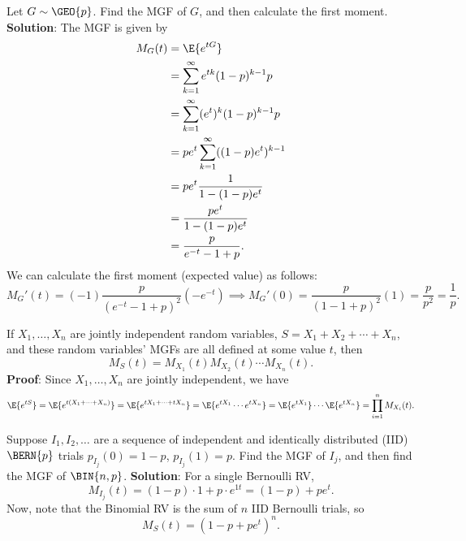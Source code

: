 \begin{Example}{}{}
    Let $ G\sim \GEO{p} $. Find the MGF
    of $ G $, and then calculate the first moment.
    \tcblower{}
    \textbf{Solution}: The MGF is given by
    \begin{align*}
        M_G(t)
         & =\E{e^{tG}}                                \\
         & =\sum_{k=1}^{\infty}e^{tk}(1-p)^{k-1}p     \\
         & =\sum_{k=1}^{\infty}(e^{t})^k(1-p)^{k-1}p  \\
         & =p e^t \sum_{k=1}^{\infty}((1-p)e^t)^{k-1} \\
         & =p e^t \frac{1}{1-(1-p)e^t}                \\
         & =\frac{pe^t}{1-(1-p)e^t}                   \\
         & =\frac{p}{e^{-t}-1+p}.
    \end{align*}
    We can calculate the first moment (expected value) as follows:
    \[ M_G'(t)=(-1)\frac{p}{(e^{-t}-1+p)^2}(-e^{-t})
        \implies M_G'(0)=\frac{p}{(1-1+p)^2}(1)=\frac{p}{p^2}=\frac{1}{p}. \]
\end{Example}
\begin{Theorem}{}{}
    If $ X_1,\ldots,X_n $ are jointly independent random variables,
    $ S=X_1+X_2+\cdots+X_n $, and these random variables' MGFs are
    all defined at some value $ t $, then
    \[ M_S(t)=M_{X_1}(t) M_{X_2}(t)\cdots M_{X_n}(t). \]
    \tcblower{}
    \textbf{Proof}: Since $ X_1,\ldots,X_n $ are jointly independent,
    we have
    \[ \E{e^{tS}}=
        \E{e^{t(X_1+\cdots+X_n)}}=\E{e^{tX_1+\cdots+tX_n}}=
        \E{e^{tX_1}\cdots e^{tX_n}}=
        \E{e^{tX_1}}\cdots \E{e^{tX_n}}=
        \prod_{i=1}^n M_{X_i}(t). \]
\end{Theorem}
\begin{Example}{}{}
    Suppose $ I_1,I_2,\ldots $ are a sequence of independent
    and identically distributed (IID) $ \BERN{p} $
    trials $ p_{I_j}(0)=1-p $, $ p_{I_j}(1)=p $. Find the
    MGF of $ I_j $, and then find the MGF of
    $ \BIN{n,p} $.
    \tcblower{}
    \textbf{Solution}: For a single Bernoulli RV,
    \[ M_{I_j}(t)=(1-p)\cdot 1+p\cdot e^{1t}=(1-p)+pe^t. \]
    Now, note that the Binomial RV is the sum of $ n $ IID
    Bernoulli trials, so
    \[ M_S(t)=(1-p+pe^t)^n. \]
\end{Example}
